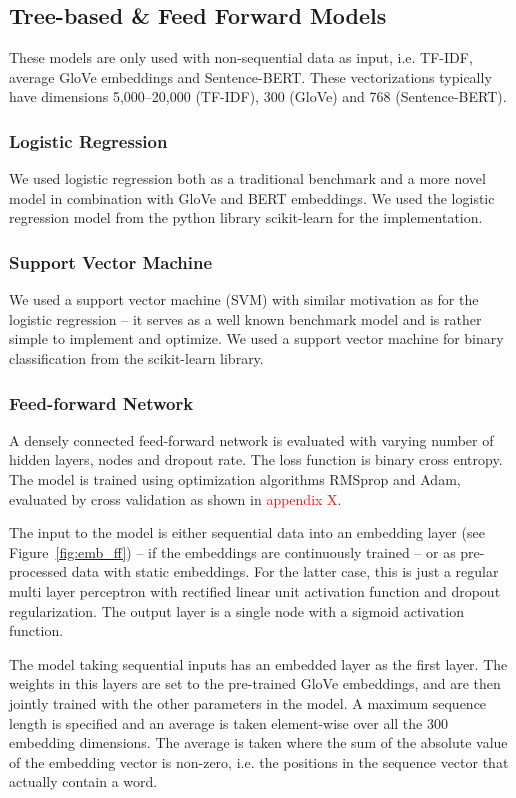 \subsection{Tree-based \& Feed Forward Models}

These models are only used with non-sequential data as input, i.e. TF-IDF, average GloVe embeddings and Sentence-BERT. These vectorizations typically have dimensions 5,000--20,000 (TF-IDF), 300 (GloVe) and 768 (Sentence-BERT). 


\subsubsection{Logistic Regression}
We used logistic regression both as a traditional benchmark and a more novel model in combination with GloVe and BERT embeddings. We used the logistic regression model from the python library scikit-learn  for the implementation.

\subsubsection{Support Vector Machine}
We used a support vector machine (SVM) with similar motivation as for the logistic regression -- it serves as a well known benchmark model and is rather simple to implement and optimize.  We used a support vector machine for binary classification from the scikit-learn library. 

\subsubsection{Feed-forward Network}
A densely connected feed-forward network is evaluated with varying number of hidden layers, nodes and dropout rate. The loss function is binary cross entropy. The model is trained using optimization algorithms RMSprop and Adam, evaluated by cross validation as shown in \textcolor{red}{appendix X}.

The input to the model is either sequential data into an embedding layer (see Figure~\ref{fig:emb_ff}) -- if the embeddings are continuously trained -- or as pre-processed data with static embeddings. For the latter case, this is just a regular multi layer perceptron with rectified linear unit activation function and dropout regularization. The output layer is a single node with a sigmoid activation function.

The model taking sequential inputs has an embedded layer as the first layer. The weights in this layers are set to the pre-trained GloVe embeddings, and are then jointly trained with the other parameters in the model. A maximum sequence length is specified and an average is taken element-wise over all the 300 embedding dimensions. The average is taken where the sum of the absolute value of the embedding vector is non-zero, i.e. the positions in the sequence vector that actually contain a word.

